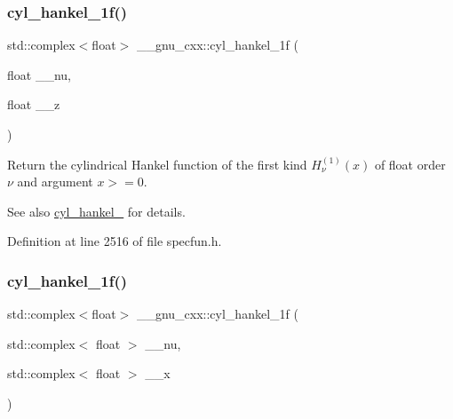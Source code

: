 \subsubsection{\texorpdfstring{cyl\+\_\+hankel\+\_\+1f()}{cyl\_hankel\_1f()}\hspace{0.1cm}{\footnotesize\ttfamily [1/2]}}
{\footnotesize\ttfamily std\+::complex$<$float$>$ \+\_\+\+\_\+gnu\+\_\+cxx\+::cyl\+\_\+hankel\+\_\+1f (\begin{DoxyParamCaption}\item[{float}]{\+\_\+\+\_\+nu,  }\item[{float}]{\+\_\+\+\_\+z }\end{DoxyParamCaption})\hspace{0.3cm}{\ttfamily [inline]}}

Return the cylindrical Hankel function of the first kind $ H^{(1)}_\nu(x) $ of {\ttfamily float} order $ \nu $ and argument $ x >= 0 $.

\begin{DoxySeeAlso}{See also}
\hyperlink{group__gnu__math__spec__func_ga5329bba77d10a9d2f15d9bbe43a70db3}{cyl\+\_\+hankel\+\_} for details. 
\end{DoxySeeAlso}


Definition at line 2516 of file specfun.\+h.

\mbox{\label{group__gnu__math__spec__func_ga810e021a3f11c1b2253c15c6f4d41143}} 
\subsubsection{\texorpdfstring{cyl\+\_\+hankel\+\_\+1f()}{cyl\_hankel\_1f()}\hspace{0.1cm}{\footnotesize\ttfamily [2/2]}}
{\footnotesize\ttfamily std\+::complex$<$float$>$ \+\_\+\+\_\+gnu\+\_\+cxx\+::cyl\+\_\+hankel\+\_\+1f (\begin{DoxyParamCaption}\item[{std\+::complex$<$ float $>$}]{\+\_\+\+\_\+nu,  }\item[{std\+::complex$<$ float $>$}]{\+\_\+\+\_\+x }\end{DoxyParamCaption})\hspace{0.3cm}{\ttfamily [inline]}}

